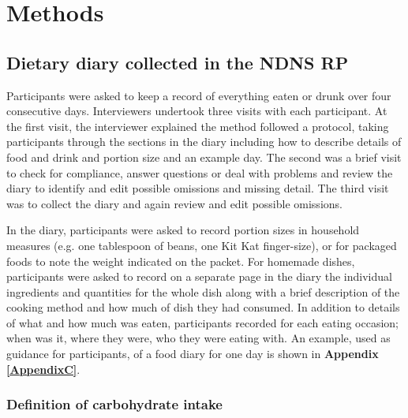 
\chapter{Methods} %

\label{Chapter 2} %


\section{Dietary diary collected in the NDNS RP}\vspace{-0.3cm}

Participants were asked to keep a record of everything eaten or drunk over four consecutive days. Interviewers undertook three visits with each participant. At the first visit, the interviewer explained the method followed a protocol, taking participants through the sections in the diary including how to describe details of food and drink and portion size and an example day. The second was a brief visit to check for compliance, answer questions or deal with problems and review the diary to identify and edit possible omissions and missing detail. The third visit was to collect the diary and again review and edit possible omissions. 

In the diary, participants were asked to record portion sizes in household measures (e.g. one tablespoon of beans, one Kit Kat finger-size), or for packaged foods to note the weight indicated on the packet. For homemade dishes, participants were asked to record on a separate page in the diary the individual ingredients and quantities for the whole dish along with a brief description of the cooking method and how much of dish they had consumed. In addition to details of what and how much was eaten, participants recorded for each eating occasion; when was it, where they were, who they were eating with. An example, used as guidance for participants, of a food diary for one day is shown in \textbf{Appendix \ref{AppendixC}}.\vspace{-0.3cm}

\subsection{Definition of carbohydrate intake}\vspace{-0.3cm}

